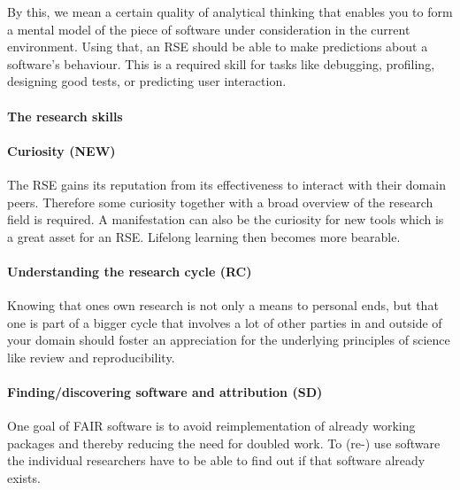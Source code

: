 \documentclass[a4paper
]{article}
\begin{document}
By this, we mean a certain quality of analytical thinking that enables
you to form a mental model of the piece of software under consideration
in the current environment. Using that, an RSE should be able to make
predictions about a software's behaviour. This is a required skill for
tasks like debugging, profiling, designing good tests, or predicting
user interaction.

\hypertarget{the-research-skills}{%
\paragraph{The research skills}\label{the-research-skills}}

\hypertarget{curiosity-new}{%
\paragraph{Curiosity (NEW)}\label{curiosity-new}}

The RSE gains its reputation from its effectiveness to interact with
their domain peers. Therefore some curiosity together with a broad
overview of the research field is required. A manifestation can also be
the curiosity for new tools which is a great asset for an RSE. Lifelong
learning then becomes more bearable.

\hypertarget{understanding-the-research-cycle-rc}{%
\paragraph{Understanding the research cycle
(RC)}\label{understanding-the-research-cycle-rc}}

Knowing that ones own research is not only a means to personal ends, but
that one is part of a bigger cycle that involves a lot of other parties
in and outside of your domain should foster an appreciation for the
underlying principles of science like review and reproducibility.

\hypertarget{findingdiscovering-software-and-attribution-sd}{%
\paragraph{Finding/discovering software and attribution
(SD)}\label{findingdiscovering-software-and-attribution-sd}}

One goal of FAIR software is to avoid reimplementation of already
working packages and thereby reducing the need for doubled work. To
(re-) use software the individual researchers have to be able to find
out if that software already exists.
\end{document}
